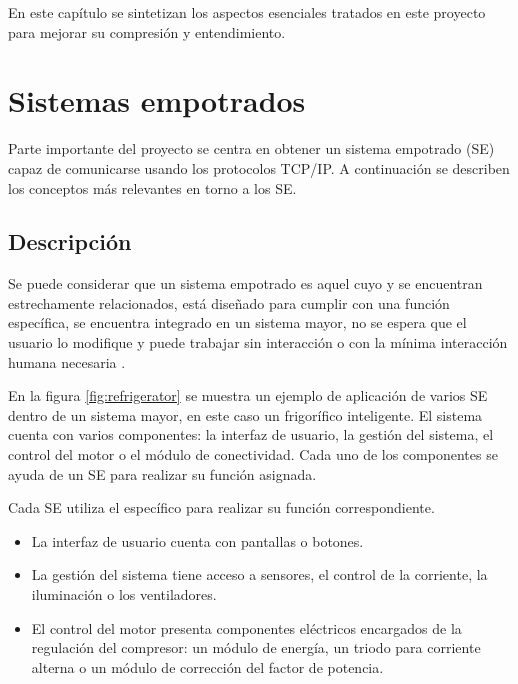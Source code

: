 En este capítulo se sintetizan los aspectos esenciales tratados en este proyecto
para mejorar su compresión y entendimiento.

\section{Sistemas empotrados}{\label{sec:se}}
Parte importante del proyecto se centra en obtener un sistema empotrado (SE)
capaz de comunicarse usando los protocolos TCP/IP. A continuación se describen
los conceptos más relevantes en torno a los SE.

\subsection{Descripción}{\label{sec:se-desc}}
Se puede considerar que un sistema empotrado es aquel cuyo
 y  se encuentran estrechamente
relacionados, está diseñado para cumplir con una función específica, se
encuentra integrado en un sistema mayor, no se espera que el usuario lo
modifique y puede trabajar sin interacción o con la mínima interacción humana
necesaria \cite{jimenez2014}.


En la figura \ref{fig:refrigerator} se muestra un ejemplo de aplicación de
varios SE dentro de un sistema mayor, en este caso un frigorífico inteligente.
El sistema cuenta con varios componentes: la interfaz de usuario, la gestión del
sistema, el control del motor o el módulo de conectividad. Cada uno de los
componentes se ayuda de un SE para realizar su función asignada.

Cada SE utiliza el  específico para realizar su función
correspondiente.
\begin{itemize}
  \item La interfaz de usuario cuenta con pantallas o botones.
  \item La gestión del sistema tiene acceso a sensores, el control de la
  corriente, la iluminación o los ventiladores.
  \item El control del motor presenta componentes eléctricos encargados de la
  regulación del compresor: un módulo de energía, un triodo para corriente
  alterna o un módulo de corrección del factor de potencia.
\end{itemize}

